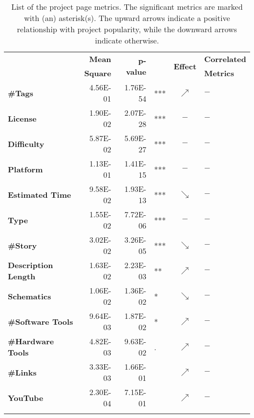 \begin{table}[t]
\centering
\scriptsize
\caption{List of the project page metrics. The significant metrics are marked with (an) asterisk(s). The upward arrows indicate a positive relationship with project popularity, while the downward arrows indicate otherwise.}
	\setlength{\tabcolsep}{3.8pt}
\label{table:RQ1}
	\begin{tabularx}{0.8\columnwidth}{>{\bfseries}lrrlcl}
	\toprule
\multirow{2}{*}{Metric} & \textbf{Mean}  & \multirow{2}{*}{\textbf{p-value}}  &     & \multirow{2}{*}{\textbf{Effect}}     &\textbf{Correlated}\\
&\textbf{Square}&& &&\textbf{Metrics} \\
	\midrule	\midrule
\#Tags                 & 4.56E-01 & 1.76E-54 & *** & $\nearrow$ & $-$                  \\
License                & 1.90E-02 & 2.07E-28 & *** & $-$        & $-$                  \\
Difficulty             & 5.87E-02 & 5.69E-27 & *** & $-$        & $-$                  \\
Platform               & 1.13E-01 & 1.41E-15 & *** & $-$ & $-$                  \\
Estimated Time        & 9.58E-02 & 1.93E-13 & *** & $\searrow$ & $-$                  \\
Type                   & 1.55E-02 & 7.72E-06 & *** & $-$        & $-$                  \\
\#Story                & 3.02E-02 & 3.26E-05 & *** & $\searrow$ & $-$                  \\
Description Length    & 1.63E-02 & 2.23E-03 & **  & $\nearrow$ & $-$                  \\
Schematics & 1.06E-02 & 1.36E-02 & *   & $\searrow$ & $-$                  \\
\#Software Tools             & 9.64E-03 & 1.87E-02 & *   & $\nearrow$ & $-$                  \\
\#Hardware Tools            & 4.82E-03 & 9.63E-02 & .   & $\nearrow$ & $-$                  \\
\#Links                & 3.33E-03 & 1.66E-01 &     & $\nearrow$ & $-$                  \\
YouTube           & 2.30E-04 & 7.15E-01 &     & $\nearrow$ & $-$              \\ \bottomrule
\multicolumn{6}{l}{$p-value$ codes:  `***'$<0$, `**'$<0.001$, `*'$<0.01$, `.'$<0.05$}\\ 
\end{tabularx}
\end{table}
